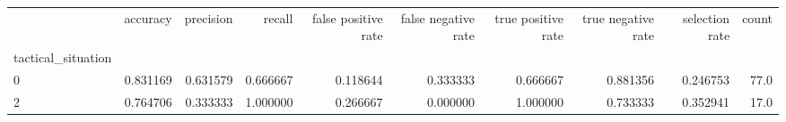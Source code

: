 \begin{tabular}{lrrrrrrrrr}
\toprule
{} &  accuracy &  precision &    recall &  false positive rate &  false negative rate &  true positive rate &  true negative rate &  selection rate &  count \\
tactical\_situation &           &            &           &                      &                      &                     &                     &                 &        \\
\midrule
0                  &  0.831169 &   0.631579 &  0.666667 &             0.118644 &             0.333333 &            0.666667 &            0.881356 &        0.246753 &   77.0 \\
2                  &  0.764706 &   0.333333 &  1.000000 &             0.266667 &             0.000000 &            1.000000 &            0.733333 &        0.352941 &   17.0 \\
\bottomrule
\end{tabular}
